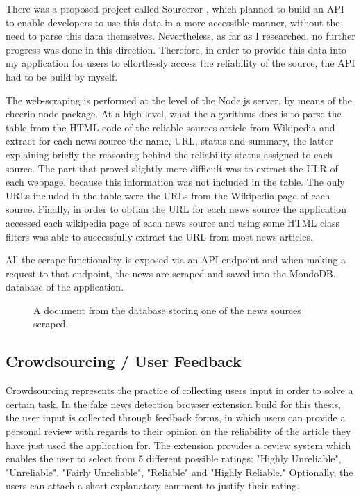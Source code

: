 There was a proposed project called Sourceror \cite{conf_wiki}, which planned to build an API to enable developers to use this data in a more accessible manner, without the need to parse this data themselves. Nevertheless, as far as I researched, no further progress was done in this direction. Therefore, in order to provide this data into my application for users to effortlessly access the reliability of the source, the API had to be build by myself.

The web-scraping is performed at the level of the Node.js server, by means of the cheerio node package. At a high-level, what the algorithms does is to parse the table from the HTML code of the reliable sources article from Wikipedia \cite{wiki_reliable_sources} and extract for each news source the name, URL, status and summary, the latter explaining briefly the reasoning behind the reliability status assigned to each source. The part that proved slightly more difficult was to extract the ULR of each webpage, because this information was not included in the table. The only URLs included in the table were the URLs from the Wikipedia page of each source. Finally, in order to obtian the URL for each news source the application accessed each wikipedia page of each news source and using some HTML class filters was able to successfully extract the URL from most news articles.

All the scrape functionality is exposed via an API endpoint and when making a request to that endpoint, the news are scraped and saved into the MondoDB. database of the application.

\begin{figure}[h]
  \centering
  \caption{A document from the database storing one of the news sources scraped.}
\end{figure}

\subsection{Crowdsourcing / User Feedback}

Crowdsourcing represents the practice of collecting users input in order to solve a certain task. In the fake news detection browser extension build for this thesis, the user input is collected through feedback forms, in which users can provide a personal review with regards to their opinion on the reliability of the article they have just used the application for. The extension provides a review system which enables the user to select from 5 different possible ratings: "Highly Unreliable", "Unreliable", "Fairly Unreliable", "Reliable" and "Highly Reliable." Optionally, the users can attach a short explanatory comment to justify their rating. 

